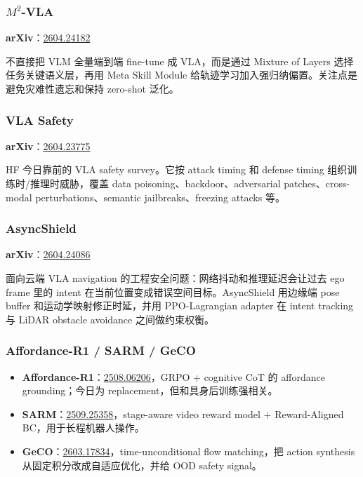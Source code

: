 \subsubsection{\texorpdfstring{$M^2$-VLA}{M2-VLA}}

\textbf{arXiv}：\href{https://arxiv.org/abs/2604.24182}{2604.24182}

不直接把 VLM 全量端到端 fine-tune 成 VLA，而是通过 Mixture of Layers 选择任务关键语义层，再用 Meta Skill Module 给轨迹学习加入强归纳偏置。关注点是避免灾难性遗忘和保持 zero-shot 泛化。

\subsubsection{VLA Safety}

\textbf{arXiv}：\href{https://arxiv.org/abs/2604.23775}{2604.23775}

HF 今日靠前的 VLA safety survey。它按 attack timing 和 defense timing 组织训练时/推理时威胁，覆盖 data poisoning、backdoor、adversarial patches、cross-modal perturbations、semantic jailbreaks、freezing attacks 等。

\subsubsection{AsyncShield}

\textbf{arXiv}：\href{https://arxiv.org/abs/2604.24086}{2604.24086}

面向云端 VLA navigation 的工程安全问题：网络抖动和推理延迟会让过去 ego frame 里的 intent 在当前位置变成错误空间目标。AsyncShield 用边缘端 pose buffer 和运动学映射修正时延，并用 PPO-Lagrangian adapter 在 intent tracking 与 LiDAR obstacle avoidance 之间做约束权衡。

\subsubsection{Affordance-R1 / SARM / GeCO}

\begin{itemize}[leftmargin=1.5em]
  \item \textbf{Affordance-R1}：\href{https://arxiv.org/abs/2508.06206}{2508.06206}，GRPO + cognitive CoT 的 affordance grounding；今日为 replacement，但和具身后训练强相关。
  \item \textbf{SARM}：\href{https://arxiv.org/abs/2509.25358}{2509.25358}，stage-aware video reward model + Reward-Aligned BC，用于长程机器人操作。
  \item \textbf{GeCO}：\href{https://arxiv.org/abs/2603.17834}{2603.17834}，time-unconditional flow matching，把 action synthesis 从固定积分改成自适应优化，并给 OOD safety signal。
\end{itemize}

